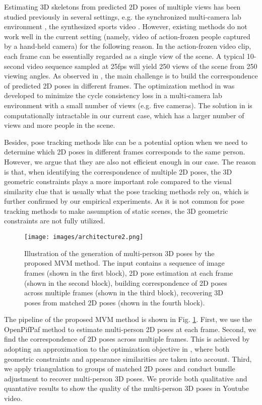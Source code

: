 \documentclass{article}
\begin{document}
Estimating 3D skeletons from predicted 2D poses of multiple views has
been studied previously in several settings, e.g. the synchronized
multi-camera lab environment \cite{dong2019fast,joo2017panoptic}, the
synthesized sports video \cite{bridgeman2019multi}. However, existing
methods do not work well in the current setting (namely, video of
action-frozen people captured by a hand-held camera) for the following
reason. In the action-frozen video clip, each frame can be essentially
regarded as a single view of the scene. A typical 10-second video
sequence sampled at 25fps will yield 250 views of the scene from 250
viewing angles.  As observed in \cite{dong2019fast}, the main challenge
is to build the correspondence of predicted 2D poses in different
frames. The optimization method in \cite{dong2019fast} was developed to
minimize the cycle consistency loss in a multi-camera lab environment
with a small number of views (e.g. five cameras). The solution in
\cite{dong2019fast} is computationally intractable in our current case,
which has a larger number of views and more people in the scene. 

Besides, pose tracking methods like \cite{andriluka2018posetrack} can be a potential option when we need to determine which 2D poses in different frames corresponds to the same person. However, we argue that they are also not efficient enough in our case. The reason is that, when identifying the correspondence of multiple 2D poses, the 3D geometric constraints plays a more important role compared to the visual similarity clue that is usually what the pose tracking methods rely on, which is further confirmed by our empirical experiments. As it is not common for pose tracking methods to make assumption of static scenes, the 3D geometric constraints are not fully utilized. 

\begin{figure}[h]
\centering
\texttt{[image: images/architecture2.png]}
\caption{Illustration of the generation of multi-person 3D poses
by the proposed MVM method.  The input contains a sequence of image
frames (shown in the first block), 2D pose estimation at each frame
(shown in the second block), building correspondence of 2D poses across
multiple frames (shown in the third block), recovering 3D poses from
matched 2D poses (shown in the fourth block).} \label{fig:framework}
\end{figure}


The pipeline of the proposed MVM method is shown in Fig.
\ref{fig:framework}. First, we use the OpenPifPaf method
\cite{kreiss2019pifpaf} to estimate multi-person 2D poses at each
frame.  Second, we find the correspondence of 2D poses across multiple
frames.  This is achieved by adopting an approximation to the
optimization objective in \cite{dong2019fast}, where both geometric
constraints and appearance similarities are taken into account.  Third,
we apply triangulation to groups of matched 2D poses and conduct bundle
adjustment to recover multi-person 3D poses.  We provide both
qualitative and quantative results to show the quality of the
multi-person 3D poses in Youtube video. 
\end{document}
